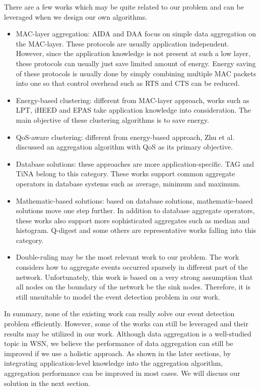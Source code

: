There are a few works which may be quite related to our problem and can be leveraged when we design our own algorithms.
\begin{itemize}
	\item MAC-layer aggregation: AIDA and DAA \cite{aida, daa} focus on simple data aggregation on the MAC-layer. These protocols are usually application independent. However, since the application knowledge is not present at such a low layer, these protocols can usually just save limited amount of energy. Energy saving of these protocols is usually done by simply combining multiple MAC packets into one so that control overhead such as RTS and CTS can be reduced.
	\item Energy-based clustering: different from MAC-layer approach, works such as LPT, iHEED and EPAS \cite{lpt, xue:lp, iheed, epas, mfst} take application knowledge into consideration. The main objective of these clustering algorithms is to save energy.
	\item QoS-aware clustering: different from energy-based approach, Zhu et al. \cite{qdap} discussed an aggregation algorithm with QoS as its primary objective.
	\item Database solutions: these approaches are more application-specific. TAG and TiNA \cite{tag, tina} belong to this category. These works support common aggregate operators in database systems such as average, minimum and maximum.
	\item Mathematic-based solutions: based on database solutions, mathematic-based solutions move one step further. In addition to database aggregate operators, these works also support more sophisticated aggregates such as median and histogram. Q-digest and some others \cite{qdigest, akca:deterministic, jiang:statistical} are representative works falling into this category.
	\item Double-ruling \cite{doubleruling} may be the most relevant work to our problem. The work considers how to aggregate events occurred sparsely in different part of the network. Unfortunately, this work is based on a very strong assumption that all nodes on the boundary of the network be the sink nodes. Therefore, it is still unsuitable to model the event detection problem in our work.
\end{itemize}

In summary, none of the existing work can really solve our event detection problem efficiently. However, some of the works can still be leveraged and their results may be utilized in our work. Although data aggregation is a well-studied topic in WSN, we believe the performance of data aggregation can still be improved if we use a holistic approach. As shown in the later sections, by integrating application-level knowledge into the aggregation algorithm, aggregation performance can be improved in most cases. We will discuss our solution in the next section.
